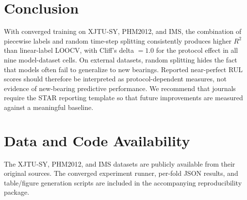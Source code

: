 \documentclass[5p,twocolumn]{elsarticle}
\begin{document}
\section{Conclusion}
With converged training on XJTU-SY, PHM2012, and IMS, the combination of piecewise labels and random time-step splitting consistently produces higher $R^2$ than linear-label LOOCV, with Cliff's delta $=1.0$ for the protocol effect in all nine model-dataset cells. On external datasets, random splitting hides the fact that models often fail to generalize to new bearings. Reported near-perfect RUL scores should therefore be interpreted as protocol-dependent measures, not evidence of new-bearing predictive performance. We recommend that journals require the STAR reporting template so that future improvements are measured against a meaningful baseline.

\section*{Data and Code Availability}
The XJTU-SY, PHM2012, and IMS datasets are publicly available from their original sources. The converged experiment runner, per-fold JSON results, and table/figure generation scripts are included in the accompanying reproducibility package.


\end{document}
